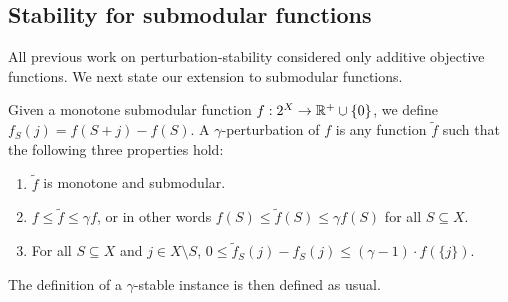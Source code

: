 \subsection{Stability for submodular functions} \label{submod-def}

All previous work on perturbation-stability considered only additive
objective functions.  We next state our extension to submodular functions.

\begin{definition} \label{d:sm} \label{def:stability}

Given a monotone submodular function $f: 2^X\rightarrow \mathbb{R}^+\cup \{0\}$, we define $f_S(j) = f(S+j) - f(S)$.
A $\gamma$-perturbation of $f$ is any function $\tilde{f}$ such that the following three properties hold:
\begin{enumerate}
\item $\tilde{f}$ is monotone and submodular.
\item $f \le \tilde{f} \le \gamma f$, or in other words $f(S) \le \tilde{f}(S)\le \gamma f(S)$ for all $S \subseteq X$.
\item For all $S \subseteq X$ and $j \in X \setminus S$, $0 \le \tilde{f}_S(j) - f_S(j) \le (\gamma -1)\cdot f(\{j\})$. \label{property}
\end{enumerate}
\end{definition}
The definition of a $\gamma$-stable instance is then defined as usual.

